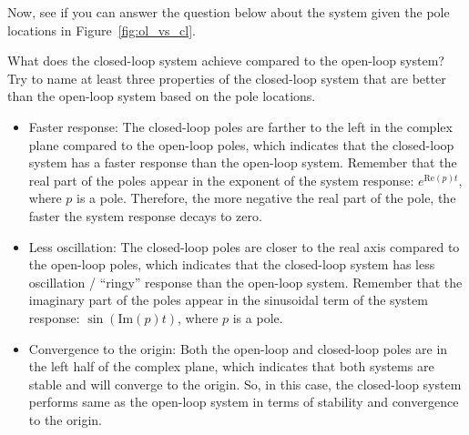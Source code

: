 \documentclass{ee122_notes}
\begin{document}
Now, see if you can answer the question below about the system given the pole locations in Figure~\ref{fig:ol_vs_cl}.
\begin{popquiz}
What does the closed-loop system achieve compared to the open-loop system? Try to name at least three properties of the closed-loop system that are better than the open-loop system based on the pole locations.
\popqsplit
\begin{itemize}
\item Faster response: The closed-loop poles are farther to the left in the complex plane compared to the open-loop poles, which indicates that the closed-loop system has a faster response than the open-loop system. Remember that the real part of the poles appear in the exponent of the system response: $e^{\text{Re}(p)t}$, where $p$ is a pole. Therefore, the more negative the real part of the pole, the faster the system response decays to zero.
\item Less oscillation: The closed-loop poles are closer to the real axis compared to the open-loop poles, which indicates that the closed-loop system has less oscillation / ``ringy'' response than the open-loop system. Remember that the imaginary part of the poles appear in the sinusoidal term of the system response: $\sin(\text{Im}(p)t)$, where $p$ is a pole. 
\item Convergence to the origin: Both the open-loop and closed-loop poles are in the left half of the complex plane, which indicates that both systems are stable and will converge to the origin. So, in this case, the closed-loop system performs same as the open-loop system in terms of stability and convergence to the origin. 
\end{itemize} 
\end{popquiz}
        
\end{document}
